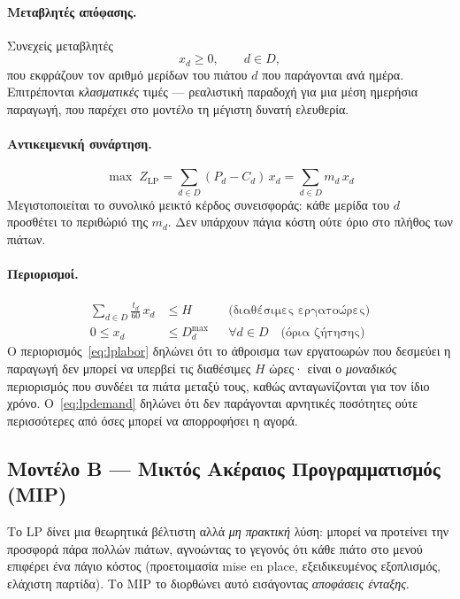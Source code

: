 \documentclass[11pt,a4paper]{article}
\newcommand{\en}[1]{\textenglish{#1}}
\begin{document}
\paragraph{Μεταβλητές απόφασης.} Συνεχείς μεταβλητές
\[ x_d \ge 0,\qquad d\in D, \]
που εκφράζουν τον αριθμό μερίδων του πιάτου $d$ που παράγονται ανά ημέρα.
Επιτρέπονται \emph{κλασματικές} τιμές — ρεαλιστική παραδοχή για μια μέση ημερήσια
παραγωγή, που παρέχει στο μοντέλο τη μέγιστη δυνατή ελευθερία.

\paragraph{Αντικειμενική συνάρτηση.}
\begin{equation}
\max\; Z_{\mathrm{LP}} = \sum_{d\in D}(P_d - C_d)\,x_d = \sum_{d\in D} m_d\, x_d
\label{eq:lpobj}
\end{equation}
Μεγιστοποιείται το συνολικό μεικτό κέρδος συνεισφοράς: κάθε μερίδα του $d$ προσθέτει
το περιθώριό της $m_d$. Δεν υπάρχουν πάγια κόστη ούτε όριο στο πλήθος των πιάτων.

\paragraph{Περιορισμοί.}
\begin{align}
\sum_{d\in D}\tfrac{t_d}{60}\,x_d &\le H && \text{(διαθέσιμες εργατοώρες)} \label{eq:lplabor}\\
0 \le x_d &\le D_d^{\max} && \forall d\in D \quad \text{(όρια ζήτησης)} \label{eq:lpdemand}
\end{align}
Ο περιορισμός~\eqref{eq:lplabor} δηλώνει ότι το άθροισμα των εργατοωρών που δεσμεύει
η παραγωγή δεν μπορεί να υπερβεί τις διαθέσιμες $H$ ώρες· είναι ο \emph{μοναδικός}
περιορισμός που συνδέει τα πιάτα μεταξύ τους, καθώς ανταγωνίζονται για τον ίδιο
χρόνο. Ο~\eqref{eq:lpdemand} δηλώνει ότι δεν παράγονται αρνητικές ποσότητες ούτε
περισσότερες από όσες μπορεί να απορροφήσει η αγορά.

\subsection{Μοντέλο Β — Μικτός Ακέραιος Προγραμματισμός (\en{MIP})}
Το \en{LP} δίνει μια θεωρητικά βέλτιστη αλλά \emph{μη πρακτική} λύση: μπορεί να
προτείνει την προσφορά πάρα πολλών πιάτων, αγνοώντας το γεγονός ότι κάθε πιάτο στο
μενού επιφέρει ένα πάγιο κόστος (προετοιμασία \en{mise en place}, εξειδικευμένος
εξοπλισμός, ελάχιστη παρτίδα). Το \en{MIP} το διορθώνει αυτό εισάγοντας
\emph{αποφάσεις ένταξης}.
\end{document}
